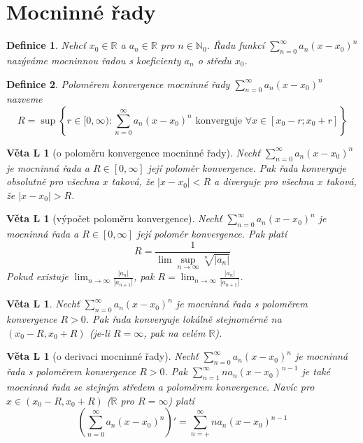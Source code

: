 \documentclass[11pt,a4paper]{article}
\newcounter{vety}
\newtheorem*{definice}{Definice}
\newtheorem{vetal}[vety]{Věta L}
\begin{document}
\pagebreak
\setcounter{vety}{0}
\section{Mocninné řady}

\begin{definice}
Nehcť $x_0 \in \mathbb{R}$ a $a_n \in \mathbb{R}$ pro $n \in \mathbb{N}_0$. Řadu funkcí $\sum_{n=0}^{\infty} a_n (x-x_0)^n$ nazýváme \emph{mocninnou řadou} s koeficienty $a_n$ o středu $x_0$.
\end{definice}

\begin{definice}
\emph{Poloměrem konvergence} mocninné řady $\sum_{n=0}^{\infty} a_n (x-x_0)^n$ nazveme $$R = \sup \left\{ r \in [ 0,\infty ) : \sum_{n=0}^{\infty}  a_n ( x - x_0 )^n \textrm{ konverguje } \forall x \in [ x_0 - r; x_0 + r ] \right\}$$
\end{definice}

\begin{vetal}[o poloměru konvergence mocninné řady]
Nechť $\sum_{n=0}^{\infty} a_n (x-x_0)^n$ je mocninná řada a $R \in [ 0, \infty ]$ její poloměr konvergence. Pak řada konverguje obsolutně pro všechna $x$ taková, že $| x - x_0| < R$ a diverguje pro všechna $x$ taková, že $| x - x_0 | > R$.
\end{vetal}

\begin{vetal}[výpočet poloměru konvergence]
Nechť $\sum_{n=0}^{\infty} a_n (x-x_0)^n$ je mocninná řada a $R \in [ 0, \infty ]$ její poloměr konvergence. Pak platí
$$R = \frac{1}{ \lim \sup_{n \rightarrow \infty} \sqrt[n]{| a_n |} }$$
Pokud existuje $\lim_{n \rightarrow \infty} \frac{|a_n|}{|a_{n+1}|}$, pak $R = \lim_{n \rightarrow \infty} \frac{|a_n|}{|a_{n+1}|}$.
\end{vetal}

\begin{vetal}
Nechť $\sum_{n=0}^{\infty} a_n (x-x_0)^n$ je mocninná řada s poloměrem konvergence $R > 0$.  Pak řada konverguje lokálně stejnoměrně na $(x_0 - R, x_0 + R)$ (je-li $R=\infty$, pak na celém $\mathbb{R}$).
\end{vetal}

\begin{vetal}[o derivaci mocninné řady]
Nechť $\sum_{n=0}^{\infty} a_n (x-x_0)^n$ je mocninná řada s poloměrem konvergence $R > 0$. Pak $\sum_{n=1}^{\infty} n a_n (x-x_0)^{n-1}$ je také mocninná řada se stejným středem a poloměrem konvergence. Navíc pro $x \in ( x_0 - R, x_0 + R )$ ($\mathbb{R}$ pro $R = \infty$) platí
$$ \left( \sum_{n=0}^{\infty} a_n (x-x_0)^n \right)' = \sum_{n=+}^{\infty} n a_n (x-x_0)^{n-1}$$
\end{vetal}
\end{document}
